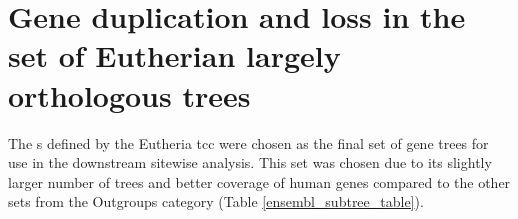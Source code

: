 


\section{Gene duplication and loss in the set of Eutherian largely orthologous trees}

The \subtr{}s defined by the Eutheria \ac{tcc} were chosen as the
final set of gene trees for use in the downstream sitewise
analysis. This set was chosen due to its slightly larger number of
trees and better coverage of human genes compared to the other \subtr
sets from the Outgroups category (Table \ref{ensembl_subtree_table}).

